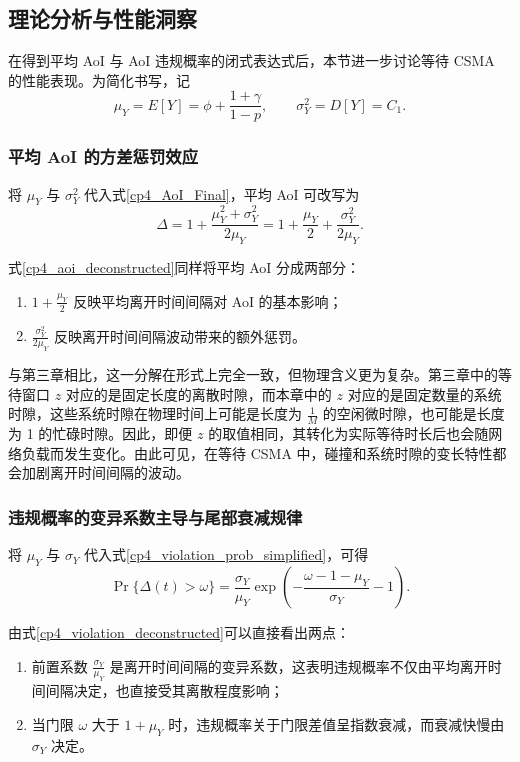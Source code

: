 \subsection{理论分析与性能洞察}

在得到平均 AoI 与 AoI 违规概率的闭式表达式后，本节进一步讨论等待 CSMA 的性能表现。为简化书写，记
\[
\mu_Y = E[Y] = \phi + \frac{1+\gamma}{1-p},\qquad
\sigma_Y^2 = D[Y] = C_1.
\]

\subsubsection{平均 AoI 的方差惩罚效应}

将 $\mu_Y$ 与 $\sigma_Y^2$ 代入式\eqref{cp4_AoI_Final}，平均 AoI 可改写为
\begin{equation}\label{cp4_aoi_deconstructed}
    \Delta = 1 + \frac{\mu_Y^2 + \sigma_Y^2}{2\mu_Y}
    = 1 + \frac{\mu_Y}{2} + \frac{\sigma_Y^2}{2\mu_Y}.
\end{equation}

式\eqref{cp4_aoi_deconstructed}同样将平均 AoI 分成两部分：
\begin{enumerate}[wide]
    \item $1 + \frac{\mu_Y}{2}$ 反映平均离开时间间隔对 AoI 的基本影响；
    \item $\frac{\sigma_Y^2}{2\mu_Y}$ 反映离开时间间隔波动带来的额外惩罚。
\end{enumerate}

与第三章相比，这一分解在形式上完全一致，但物理含义更为复杂。第三章中的等待窗口 $z$ 对应的是固定长度的离散时隙，而本章中的 $z$ 对应的是固定数量的系统时隙，这些系统时隙在物理时间上可能是长度为 $\frac{1}{M}$ 的空闲微时隙，也可能是长度为 1 的忙碌时隙。因此，即便 $z$ 的取值相同，其转化为实际等待时长后也会随网络负载而发生变化。由此可见，在等待 CSMA 中，碰撞和系统时隙的变长特性都会加剧离开时间间隔的波动。

\subsubsection{违规概率的变异系数主导与尾部衰减规律}

将 $\mu_Y$ 与 $\sigma_Y$ 代入式\eqref{cp4_violation_prob_simplified}，可得
\begin{equation}\label{cp4_violation_deconstructed}
    \Pr\{\Delta(t)>\omega\}=
    \frac{\sigma_Y}{\mu_Y}
    \exp\left(-\frac{\omega-1-\mu_Y}{\sigma_Y}-1\right).
\end{equation}

由式\eqref{cp4_violation_deconstructed}可以直接看出两点：
\begin{enumerate}[wide]
    \item 前置系数 $\frac{\sigma_Y}{\mu_Y}$ 是离开时间间隔的变异系数，这表明违规概率不仅由平均离开时间间隔决定，也直接受其离散程度影响；
    \item 当门限 $\omega$ 大于 $1+\mu_Y$ 时，违规概率关于门限差值呈指数衰减，而衰减快慢由 $\sigma_Y$ 决定。
\end{enumerate}

